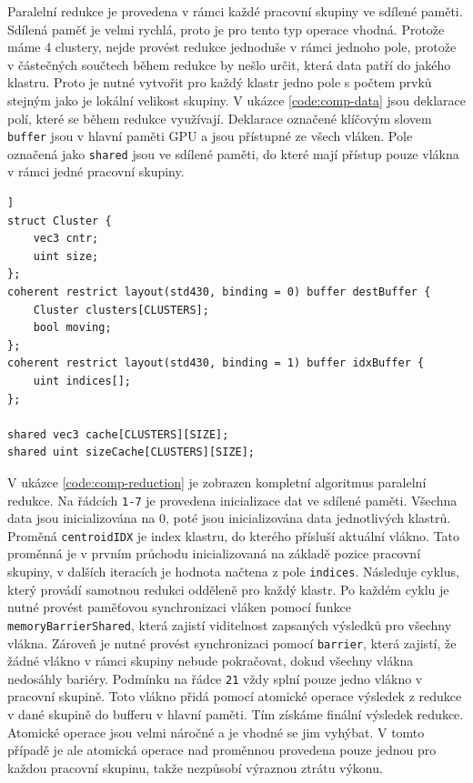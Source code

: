 \documentclass[11pt,twoside,a4paper]{book}
\begin{document}
Paralelní redukce je provedena v rámci každé pracovní skupiny ve sdílené paměti. Sdílená paměť je velmi rychlá, proto je pro tento typ operace vhodná. Protože máme 4 clustery, nejde provést redukce jednoduše v rámci jednoho pole, protože v částečných součtech během redukce by nešlo určit, která data patří do jakého klastru. Proto je nutné vytvořit pro každý klastr jedno pole s počtem prvků stejným jako je lokální velikost skupiny. V ukázce \ref{code:comp-data} jsou deklarace polí, které se během redukce využívají. Deklarace označené klíčovým slovem \texttt{buffer} jsou v hlavní paměti GPU a jsou přístupné ze všech vláken. Pole označená jako \texttt{shared} jsou ve sdílené paměti, do které mají přístup pouze vlákna v rámci jedné pracovní skupiny.


\begin{lstlisting}[caption={Datové struktury potřebné pro sečtení normál pomocí paralelní redukce.},label={code:comp-data},firstnumber=1,float=[ht]]
struct Cluster {
	vec3 cntr;
	uint size;
};
coherent restrict layout(std430, binding = 0) buffer destBuffer {
	Cluster clusters[CLUSTERS];
	bool moving;
};
coherent restrict layout(std430, binding = 1) buffer idxBuffer {
	uint indices[];
};

shared vec3 cache[CLUSTERS][SIZE];
shared uint sizeCache[CLUSTERS][SIZE];
\end{lstlisting}


V ukázce \ref{code:comp-reduction} je zobrazen kompletní algoritmus paralelní redukce. Na řádcích \texttt{1-7} je provedena inicializace dat ve sdílené paměti. Všechna data jsou inicializována na 0, poté jsou inicializována data jednotlivých klastrů. Proměná \texttt{centroidIDX} je index klastru, do kterého přísluší aktuální vlákno. Tato proměnná je v prvním průchodu inicializovaná na základě pozice pracovní skupiny, v dalších iteracích je hodnota načtena z pole \texttt{indices}. Následuje cyklus, který provádí samotnou redukci odděleně pro každý klastr. Po každém cyklu je nutné provést paměťovou synchronizaci vláken pomocí funkce  \texttt{memoryBarrierShared}, která zajistí viditelnost zapsaných výsledků pro všechny vlákna. Zároveň je nutné provést synchronizaci pomocí \texttt{barrier}, která zajistí, že žádné vlákno v rámci skupiny nebude pokračovat, dokud všechny vlákna nedosáhly bariéry. Podmínku na řádce \texttt{21} vždy splní pouze jedno vlákno v pracovní skupině. Toto vlákno přidá pomocí atomické operace výsledek z redukce v dané skupině do bufferu v hlavní paměti. Tím získáme finální výsledek redukce. Atomické operace jsou velmi náročné a je vhodné se jim vyhýbat. V tomto případě je ale atomická operace nad proměnnou provedena pouze jednou pro každou pracovní skupinu, takže nezpůsobí výraznou ztrátu výkonu.
\end{document}
